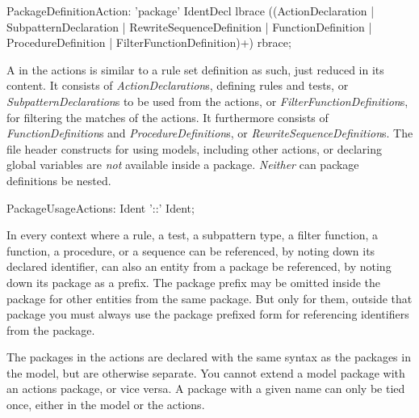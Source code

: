 \begin{rail}
  PackageDefinitionAction: 'package' IdentDecl lbrace ((ActionDeclaration | SubpatternDeclaration | RewriteSequenceDefinition | FunctionDefinition | ProcedureDefinition | FilterFunctionDefinition)+) rbrace;
\end{rail}

A  in the actions is similar to a rule set definition as such, just reduced in its content.
It consists of \emph{ActionDeclaration}s, defining rules and tests, or \emph{SubpatternDeclaration}s to be used from the actions, or \emph{FilterFunctionDefinition}s, for filtering the matches of the actions.
It furthermore consists of \emph{FunctionDefinition}s and \emph{ProcedureDefinition}s, or \emph{RewriteSequenceDefinition}s. 
The file header constructs for using models, including other actions, or declaring global variables are \emph{not} available inside a package.
\emph{Neither} can package definitions be nested.

\begin{rail}
  PackageUsageActions: Ident '::' Ident;
\end{rail}

In every context where a rule, a test, a subpattern type, a filter function, a function, a procedure, or a sequence can be referenced, by noting down its declared identifier, 
can also an entity from a package be referenced,
by noting down its package as a prefix.
The package prefix may be omitted inside the package for other entities from the same package.
But only for them, outside that package you must always use the package prefixed form for referencing identifiers from the package.

The packages in the actions are declared with the same syntax as the packages in the model, but are otherwise separate. 
You cannot extend a model package with an actions package, or vice versa.
A package with a given name can only be tied once, either in the model or the actions.

